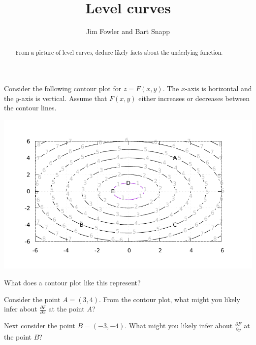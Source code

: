 \documentclass{ximera}
\author{Jim Fowler and Bart Snapp}
\title{Level curves}
\begin{document}
\begin{abstract}
From a picture of level curves, deduce likely facts about the underlying function.
\end{abstract}

Consider the following contour plot for $z = F(x,y)$.  The $x$-axis is horizontal and the $y$-axis is vertical.  Assume that $F(x,y)$ either increases or decreases between the contour lines.
\begin{image}
\includegraphics[width=.9\linewidth]{contourPlot1.pdf}
\end{image}
\begin{exercise}
What does a contour plot like this represent?
\begin{multipleChoice}
\end{multipleChoice}
\end{exercise}


\begin{exercise}
Consider the point $A = (3,4)$.  From the contour plot, what might you likely infer about $\frac{\partial F}{\partial x}$ at the point $A$?
\begin{multipleChoice}
\end{multipleChoice}
\end{exercise}

\begin{exercise}
Next consider the point $B = (-3,-4)$.  What might you likely infer about $\frac{\partial F}{\partial y}$ at the point $B$?
\begin{multipleChoice}
\end{multipleChoice}
\end{exercise}
\end{document}
